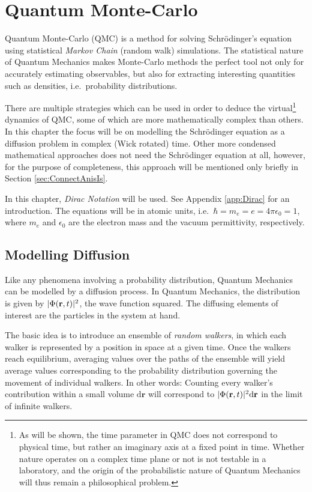 \chapter{Quantum Monte-Carlo}
\label{ch:QMC}

Quantum Monte-Carlo (QMC) is a method for solving Schrödinger's equation using statistical \textit{Markov Chain} (random walk) simulations. The statistical nature of Quantum Mechanics makes Monte-Carlo methods the perfect tool not only for accurately estimating observables, but also for extracting interesting quantities such as densities, i.e.~probability distributions. 

There are multiple strategies which can be used in order to deduce the virtual\footnote{As will be shown, the time parameter in QMC does not correspond to physical time, but rather an imaginary axis at a fixed point in time. Whether nature operates on a complex time plane or not is not testable in a laboratory, and the origin of the probabilistic nature of Quantum Mechanics will thus remain a philosophical problem.} dynamics of QMC, some of which are more mathematically complex than others. In this chapter the focus will be on modelling the Schrödinger equation as a diffusion problem in complex (Wick rotated) time. Other more condensed mathematical approaches does not need the Schrödinger equation at all, however, for the purpose of completeness, this approach will be mentioned only briefly in Section \ref{sec:ConnectAnisIs}.

In this chapter, \textit{Dirac Notation} will be used. See Appendix \ref{app:Dirac} for an introduction. The equations will be in atomic units, i.e.~$\hbar = m_e = e = 4\pi\epsilon_0 = 1$, where $m_e$ and $\epsilon_0$ are the electron mass and the vacuum permittivity, respectively.

\section{Modelling Diffusion}

Like any phenomena involving a probability distribution, Quantum Mechanics can be modelled by a diffusion process. In Quantum Mechanics, the distribution is given by $|\Phi(\mathbf{r}, t)|^2$, the wave function squared. The diffusing elements of interest are the particles in the system at hand. 

The basic idea is to introduce an ensemble of \textit{random walkers}, in which each walker is represented by a position in space at a given time. Once the walkers reach equilibrium, averaging values over the paths of the ensemble will yield average values corresponding to the probability distribution governing the movement of individual walkers. In other words: Counting every walker's contribution within a small volume $\mathrm{d}\mathbf{r}$ will correspond to $|\Phi(\mathbf{r}, t)|^2\mathrm{d}\mathbf{r}$ in the limit of infinite walkers.

